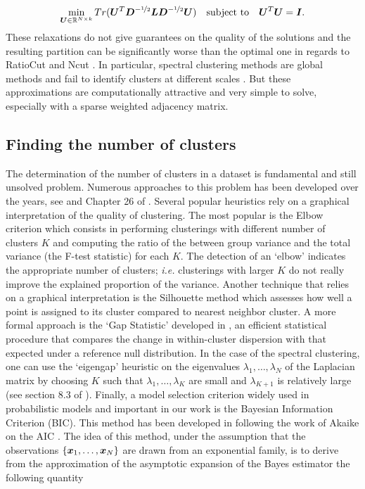 \begin{equation}
  \min_{\boldsymbol U\in{\mathbb R}^{N\times k}} Tr(\boldsymbol U^T\boldsymbol D^{-\nicefrac{1}{2}}\boldsymbol L\boldsymbol D^{-\nicefrac{1}{2}}\boldsymbol U)\quad \textnormal{subject to}\quad \boldsymbol U^T\boldsymbol U = \boldsymbol I.
\end{equation}
These relaxations do not give guarantees on the quality of the solutions and the resulting partition can be significantly worse than the optimal one in regards to RatioCut and Ncut \citep{Guattery98,Nadler07fundamentallimitations}. In particular, spectral clustering methods are global methods and fail to identify clusters at different scales \citep{Nadler07fundamentallimitations}. But these approximations are computationally attractive and very simple to solve, especially with a sparse weighted adjacency matrix.

\subsection{Finding the number of clusters}\label{sec:estim_nb_clusters}
\label{sec:finding_clusters_nb}
The determination of the number of clusters in a dataset is fundamental and still unsolved problem. Numerous approaches to this problem has been developed over the years, see \citep{Hardy:1996:NC:255810.255820,Milligan1985} and Chapter 26 of \citep{hennig2015handbook}. Several popular heuristics rely on a graphical interpretation of the quality of clustering. The most popular is the Elbow criterion which consists in performing clusterings with different number of clusters $K$ and computing the ratio of the between group variance and the total variance (the F-test statistic) for each $K$. The detection of an `elbow' indicates the appropriate number of clusters; \textit{i.e.} clusterings with larger $K$ do not really improve the explained proportion of the variance. Another technique that relies on a graphical interpretation is the Silhouette method \citep{Rousseeuw:1987:SGA:38768.38772} which assesses how well a point is assigned to its cluster compared to nearest neighbor cluster. A more formal approach is the `Gap Statistic' developed in \citep{gap_stat_tibsh_2001}, an efficient statistical procedure that compares the change in within-cluster dispersion with that expected under a reference null distribution. In the case of the spectral clustering, one can use the `eigengap' heuristic on the eigenvalues $\lambda_1,\dots,\lambda_N$ of the Laplacian matrix by choosing $K$ such that $\lambda_1,\dots,\lambda_K$ are small and $\lambda_{K+1}$ is relatively large (see section 8.3 of \citep{Luxburg:2007:TSC:1288822.1288832}). Finally, a model selection criterion widely used in probabilistic models and important in our work is the Bayesian Information Criterion (BIC). This method has been developed in \citep{schwarz1978} following the work of Akaike on the AIC \citep{Akaike1998}. The idea of this method, under the assumption that the observations $\{\boldsymbol x_1,\dots,\boldsymbol x_N\}$ are drawn from an exponential family, is to derive from the approximation of the asymptotic expansion of the Bayes estimator the following quantity
